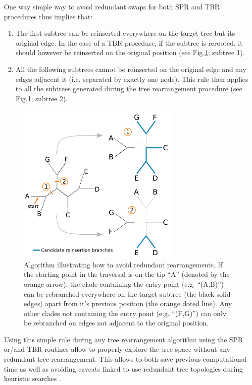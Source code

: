 \documentclass[12pt,letterpaper]{article}
\begin{document}
One way simple way to avoid redundant swaps for both SPR and TBR procedures thus implies that:
\begin{enumerate}
    \item The first subtree can be reinserted everywhere on the target tree but its original edge. In the case of a TBR procedure, if the subtree is rerooted, it should however be reinserted on the original position (see Fig.\ref{Figure_Neighbor}; subtree 1).
    \item All the following subtrees cannot be reinserted on the original edge and any edges adjacent it (i.e. separated by exactly one node). This rule then applies to all the subtrees generated during the tree rearrangement procedure (see Fig.\ref{Figure_Neighbor}; subtree 2).
\end{enumerate}

\begin{figure}[!htbp]
\centering
   \includegraphics[width=0.7\textwidth]{Figure/Figure_Neighbour.pdf}
\caption{Algorithm illustrating how to avoid redundant rearrangements. If the starting point in the traversal is on the tip ``A'' (denoted by the orange arrow), the clade containing the entry point (e.g. ``(A,B)'') can be rebranched everywhere on the target subtree (the black solid edges) apart from it's previous position (the orange doted line). Any other clades not containing the entry point (e.g. ``(F,G)'') can only be rebranched on edges not adjacent to the original position.}
\label{Figure_Neighbor}
\end{figure}

Using this simple rule during any tree rearrangement algorithm using the SPR or/and TBR routines allow to properly explore the tree space \citep[i.e. the correct number of topologies are visited, following][]{allen2001subtree} without any redundant tree rearrangement.
This allows to both save previous computational time as well as avoiding caveats linked to use redundant tree topologies during heuristic searches \citep{goloboff2014bias}.
\end{document}
